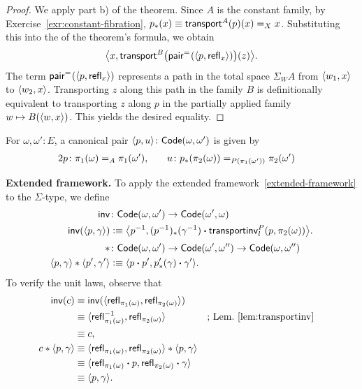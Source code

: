 \begin{proof}
    We apply part b) of the theorem. Since $A$ is the constant family, by Exercise~\ref{exr:constant-fibration}, $p_*(x)\equiv\mathsf{transport}^A(p)(x)\mathrel{=_{X}}x$. Substituting this into the \rhs of the theorem's formula, we obtain
    \[
        \bigl\langle
            x,
            \mathsf{transport}^B\bigl(
                \mathsf{pair}^{\mathrel{=_{}}}(
                    \langle p,\mathsf{refl}_x\rangle
                )
            \bigr)(z)
        \bigr\rangle.
    \]
    The term $\mathsf{pair}^{\mathrel{=_{}}}(\langle p,\mathsf{refl}_x\rangle)$ represents a path in the total space $\Sigma_WA$ from $\langle w_1,x\rangle$ to $\langle w_2,x\rangle$. Transporting $z$ along this path in the family $B$ is definitionally equivalent to transporting $z$ along $p$ in the partially applied family $w\mapsto B(\langle w,x\rangle)$. This yields the desired equality. 
\end{proof}

\begin{rem}
    For $\omega,\omega'\colon E$, a canonical pair $\dep{p,u}\colon\fun{Code}(\omega,\omega')$ is given by
    \begin{alignat*}2
        p&\colon\pi_1(\omega)\eq A\pi_1(\omega'),
        &\quad u&\colon p_*(\pi_2(\omega))
            \eq{P(\pi_1(\omega'))}\pi_2(\omega')
    \end{alignat*}
\end{rem}

\textbf{Extended framework.} To apply the extended framework~\ref{extended-framework} to the $\Sigma$-type, we define
\begin{align}
    \fun{inv}
        &\colon\fun{Code}(\omega,\omega')
            \to\fun{Code}(\omega',\omega)\nonumber\\
    \fun{inv}(\dep{p,\gamma})
        &\defeq\bigdep{p^{-1},(p^{-1})_*(\gamma^{-1})
        \ct
        \fun{transportinv}_l^P(p,\pi_2(\omega))}.
        \label{eq:Sigma-inv}\\[1mm]
    \ect
        &\colon\fun{Code}(\omega,\omega')
            \to\fun{Code}(\omega',\omega'')
            \to\fun{Code}(\omega,\omega'')\nonumber\\
    \dep{p,\gamma}\ect\dep{p',\gamma'}
        &\defeq\dep{p\ct p',p'_*(\gamma)\ct\gamma'}.\nonumber
\end{align}
To verify the unit laws, observe that
\begin{align*}
    \mathsf{inv}(c)
        &\equiv\mathsf{inv}(\langle\mathsf{refl}_{\pi_1(\omega)}
            ,\mathsf{refl}_{\pi_2(\omega)}\rangle)\\
        &\equiv\langle\mathsf{refl}_{\pi_1(\omega)}^{-1}
            ,\mathsf{refl}_{\pi_2(\omega)}\rangle
            &&\text{; Lem.~\ref{lem:transportinv}}\\
        &\equiv c,\\
    c\mathbin\ast\langle p,\gamma\rangle
        &\equiv\langle\mathsf{refl}_{\pi_1(\omega)}
            ,\mathsf{refl}_{\pi_2(\omega)}\rangle\mathbin\ast\langle p,\gamma\rangle\\
        &\equiv\langle\mathsf{refl}_{\pi_1(\omega)}\mathbin{\boldsymbol{\cdot}} p
            ,\mathsf{refl}_{\pi_2(\omega)}\mathbin{\boldsymbol{\cdot}}\gamma\rangle\\
        &\equiv\langle p,\gamma\rangle.
\end{align*}

